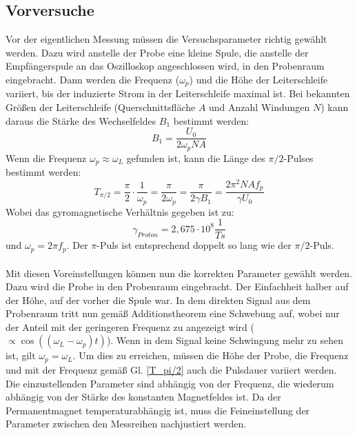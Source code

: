\documentclass[12pt,a4paper]{article}
\begin{document}
\subsection{Vorversuche}
Vor der eigentlichen Messung müssen die Versuchsparameter richtig gewählt werden. Dazu wird anstelle der Probe eine kleine Spule, die anstelle der Empfängerspule an das Oszilloskop angeschlossen wird, in den Probenraum eingebracht. Dann werden die Frequenz ($\omega _p$) und die Höhe der Leiterschleife variiert, bis der induzierte Strom in der Leiterschleife maximal ist. Bei bekannten Größen der Leiterschleife (Querschnittsfläche $A$ und Anzahl Windungen $N$) kann daraus die Stärke des Wechselfeldes $B_1$ bestimmt werden:
\begin{equation}
\label{B1}
B_1 = \dfrac{U_0}{2 \omega _p N A}
\end{equation}
Wenn die Frequenz $\omega _p \approx \omega _L$ gefunden ist, kann die Länge des $\pi /2$-Pulses bestimmt werden:
\begin{equation}
\label{T_pi/2}
T_{\pi /2} = \dfrac{\pi}{2} \cdot \dfrac{1}{\omega _p} = \dfrac{\pi}{2 \omega _p} = \dfrac{\pi}{2 \gamma B_1} = \dfrac{2 \pi^2 N A f_p}{\gamma U_0}
\end{equation}
Wobei das gyromagnetische Verhältnis gegeben ist zu:
\begin{equation*}
\gamma _{Proton} = 2,675 \cdot 10^{8} \dfrac{1}{T s} 
\end{equation*}
und $\omega_p = 2 \pi f_p$.
Der $\pi$-Puls ist entsprechend doppelt so lang wie der $\pi /2$-Puls.\\
\\
Mit diesen Voreinstellungen können nun die korrekten Parameter gewählt werden. Dazu wird die Probe in den Probenraum eingebracht. Der Einfachheit halber auf der Höhe, auf der vorher die Spule war. In dem direkten Signal aus dem Probenraum tritt nun gemäß Additionstheorem eine Schwebung auf, wobei nur der Anteil mit der geringeren Frequenz zu angezeigt wird ($\propto \cos ((\omega _L - \omega _p) t)$). Wenn in dem Signal keine Schwingung mehr zu sehen ist, gilt $\omega _p = \omega _L$. Um dies zu erreichen, müssen die Höhe der Probe, die Frequenz und mit der Frequenz gemäß Gl. \ref{T_pi/2} auch die Pulsdauer variiert werden.\\
Die einzustellenden Parameter sind abhängig von der Frequenz, die wiederum abhängig von der Stärke des konstanten Magnetfeldes ist. Da der Permanentmagnet temperaturabhängig ist, muss die Feineinstellung der Parameter zwischen den Messreihen nachjustiert werden.
\end{document}
